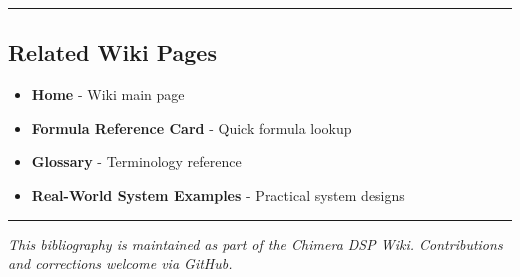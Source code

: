 \begin{center}\rule{0.5\linewidth}{0.5pt}\end{center}

\subsection{\texorpdfstring{Related Wiki Pages}{Related Wiki Pages}}\label{related-wiki-pages}

\begin{itemize}
\tightlist
\item
  \textbf{Home} - Wiki main page
\item
  \textbf{Formula Reference Card} - Quick formula lookup
\item
  \textbf{Glossary} - Terminology reference
\item
  \textbf{Real-World System Examples} - Practical system designs
\end{itemize}

\begin{center}\rule{0.5\linewidth}{0.5pt}\end{center}

\emph{This bibliography is maintained as part of the Chimera DSP Wiki.
Contributions and corrections welcome via GitHub.}
